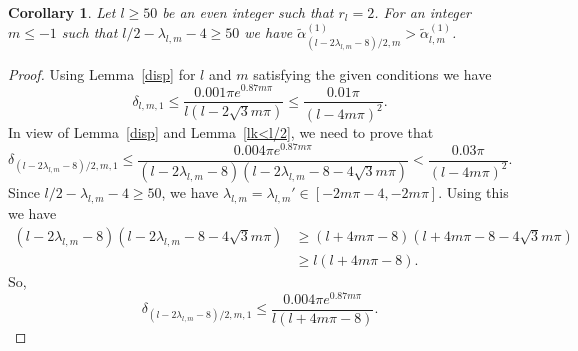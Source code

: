 \documentclass[12pt,reqno]{amsart}
\newtheorem{cor}{Corollary}
\newcommand{\lemref}[1]{Lemma~\ref{#1}}
\begin{document}
\begin{cor}\label{ck<l/2}
Let $l\ge50$ be an even integer such that $r_l=2$. For an integer $m\le -1$ such that
$l/2-\lambda_{l,m}-4\ge 50$ we have
$\tilde\alpha_{(l-2\lambda_{l,m}-8)/2,m}^{(1)}>\tilde\alpha_{l,m}^{(1)}$.
\end{cor}
\begin{proof}
%
%    
Using \lemref{disp} for $l$ and $m$ satisfying the given conditions we have
 $$
 \delta_{l,m,1}\le \frac{0.001\pi e^{0.87m\pi}}{l(l-2\sqrt3m\pi)}\le \frac{0.01\pi}{(l-4m\pi)^2}.
 $$
In view of \lemref{disp} and \lemref{lk<l/2}, we need to prove that 
  $$
  \delta_{(l-2\lambda_{l,m}-8)/2,m,1}\le \frac{0.004\pi e^{0.87m\pi}}{(l-2\lambda_{l,m}-8)(l-2\lambda_{l,m}-8-4\sqrt3 m\pi)}<\frac{0.03\pi}{(l-4m\pi)^2}.
 $$
 Since $l/2-\lambda_{l,m}-4\ge50$, we have
 $ \lambda_{l,m}=\lambda_{l,m}'\in[-2m\pi-4,-2m\pi]$. Using this we have
\begin{align*}
 (l-2\lambda_{l,m}-8)(l-2\lambda_{l,m}-8-4\sqrt3 m\pi)&\ge (l+4m\pi-8)(l+4m\pi-8-4\sqrt3m\pi)\\&\ge l(l+4m\pi-8).
\end{align*}
So,
 $$
  \delta_{(l-2\lambda_{l,m}-8)/2,m,1}\le \frac{0.004\pi e^{0.87m\pi}}{l(l+4m\pi-8)}.
$$
\end{proof}
\end{document}
